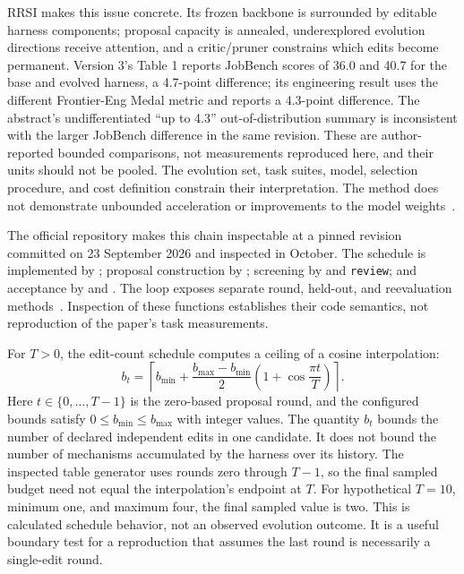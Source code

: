 RRSI makes this issue concrete. Its frozen backbone is surrounded by editable harness components; proposal capacity is annealed, underexplored evolution directions receive attention, and a critic/pruner constrains which edits become permanent. Version 3's Table 1 reports JobBench scores of 36.0 and 40.7 for the base and evolved harness, a 4.7-point difference; its engineering result uses the different Frontier-Eng Medal metric and reports a 4.3-point difference. The abstract's undifferentiated ``up to 4.3'' out-of-distribution summary is inconsistent with the larger JobBench difference in the same revision. These are author-reported bounded comparisons, not measurements reproduced here, and their units should not be pooled. The evolution set, task suites, model, selection procedure, and cost definition constrain their interpretation. The method does not demonstrate unbounded acceleration or improvements to the model weights~\cite{rrsi2026}.

The official repository makes this chain inspectable at a pinned revision committed on 23 September 2026 and inspected in October. The schedule is implemented by ; proposal construction by ; screening by  and \texttt{review}; and acceptance by  and . The loop exposes separate round, held-out, and reevaluation methods~\cite{rewrite_rrsi_repo}. Inspection of these functions establishes their code semantics, not reproduction of the paper's task measurements.

For $T>0$, the edit-count schedule computes a ceiling of a cosine interpolation:
\begin{equation}
 b_t=\left\lceil b_{\min}+
 \frac{b_{\max}-b_{\min}}2
 \left(1+\cos\frac{\pi t}{T}\right)\right\rceil.
\end{equation}
Here $t\in\{0,\ldots,T-1\}$ is the zero-based proposal round, and the configured bounds satisfy $0\leq b_{\min}\leq b_{\max}$ with integer values. The quantity $b_t$ bounds the number of declared independent edits in one candidate. It does not bound the number of mechanisms accumulated by the harness over its history. The inspected table generator uses rounds zero through $T-1$, so the final sampled budget need not equal the interpolation's endpoint at $T$. For hypothetical $T=10$, minimum one, and maximum four, the final sampled value is two. This is calculated schedule behavior, not an observed evolution outcome. It is a useful boundary test for a reproduction that assumes the last round is necessarily a single-edit round.

